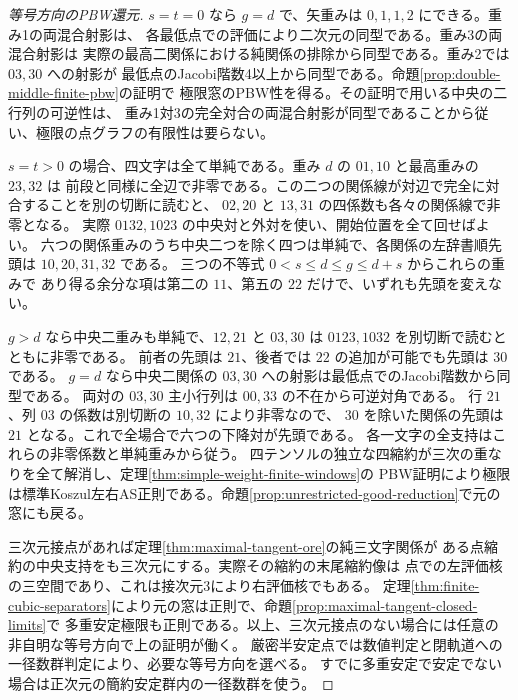 \begin{proof}[等号方向のPBW還元]
$s=t=0$ なら $g=d$ で、矢重みは $0,1,1,2$ にできる。重み1の両混合射影は、
各最低点での評価により二次元の同型である。重み3の両混合射影は
実際の最高二関係における純関係の排除から同型である。重み2では $03,30$ への射影が
最低点のJacobi階数4以上から同型である。命題\ref{prop:double-middle-finite-pbw}の証明で
極限窓のPBW性を得る。その証明で用いる中央の二行列の可逆性は、
重み1対3の完全対合の両混合射影が同型であることから従い、極限の点グラフの有限性は要らない。

$s=t>0$ の場合、四文字は全て単純である。重み $d$ の $01,10$ と最高重みの $23,32$ は
前段と同様に全辺で非零である。この二つの関係線が対辺で完全に対合することを別の切断に読むと、
$02,20$ と $13,31$ の四係数も各々の関係線で非零となる。
実際 $0132,1023$ の中央対と外対を使い、開始位置を全て回せばよい。
六つの関係重みのうち中央二つを除く四つは単純で、各関係の左辞書順先頭は $10,20,31,32$ である。
三つの不等式 $0<s\le d\le g\le d+s$ からこれらの重みで
あり得る余分な項は第二の $11$、第五の $22$ だけで、いずれも先頭を変えない。

$g>d$ なら中央二重みも単純で、$12,21$ と $03,30$ は $0123,1032$ を別切断で読むとともに非零である。
前者の先頭は $21$、後者では $22$ の追加が可能でも先頭は $30$ である。
$g=d$ なら中央二関係の $03,30$ への射影は最低点でのJacobi階数から同型である。
両対の $03,30$ 主小行列は $00,33$ の不在から可逆対角である。
行 $21$、列 $03$ の係数は別切断の $10,32$ により非零なので、
$30$ を除いた関係の先頭は $21$ となる。これで全場合で六つの下降対が先頭である。
各一文字の全支持はこれらの非零係数と単純重みから従う。
四テンソルの独立な四縮約が三次の重なりを全て解消し、定理\ref{thm:simple-weight-finite-windows}の
PBW証明により極限は標準Koszul左右AS正則である。命題\ref{prop:unrestricted-good-reduction}で元の窓にも戻る。

三次元接点があれば定理\ref{thm:maximal-tangent-ore}の純三文字関係が
ある点縮約の中央支持をも三次元にする。実際その縮約の末尾縮約像は
点での左評価核の三空間であり、これは接次元3により右評価核でもある。
定理\ref{thm:finite-cubic-separators}により元の窓は正則で、命題\ref{prop:maximal-tangent-closed-limits}で
多重安定極限も正則である。以上、三次元接点のない場合には任意の非自明な等号方向で上の証明が働く。
厳密半安定点では数値判定と閉軌道への一径数群判定により、必要な等号方向を選べる。
すでに多重安定で安定でない場合は正次元の簡約安定群内の一径数群を使う。
\end{proof}
